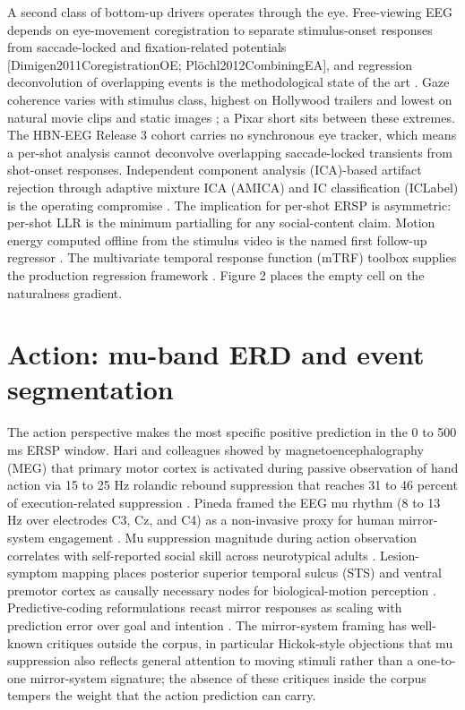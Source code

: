 \documentclass[preprint,12pt]{elsarticle}
\begin{document}
A second class of bottom-up drivers operates through the eye. Free-viewing EEG depends on eye-movement coregistration to separate stimulus-onset responses from saccade-locked and fixation-related potentials [Dimigen2011CoregistrationOE; Plöchl2012CombiningEA], and regression deconvolution of overlapping events is the methodological state of the art \cite{Dimigen2021RegressionbasedAO}. Gaze coherence varies with stimulus class, highest on Hollywood trailers and lowest on natural movie clips and static images \cite{Dorr2010VariabilityOE}; a Pixar short sits between these extremes. The HBN-EEG Release 3 cohort carries no synchronous eye tracker, which means a per-shot analysis cannot deconvolve overlapping saccade-locked transients from shot-onset responses. Independent component analysis (ICA)-based artifact rejection through adaptive mixture ICA (AMICA) and IC classification (ICLabel) is the operating compromise \cite{Bell1997TheC}. The implication for per-shot ERSP is asymmetric: per-shot LLR is the minimum partialling for any social-content claim. Motion energy computed offline from the stimulus video is the named first follow-up regressor \cite{Nishimoto2011ReconstructingVE,Nentwich2023SemanticNM}. The multivariate temporal response function (mTRF) toolbox supplies the production regression framework \cite{Crosse2016TheMT}. Figure 2 places the empty cell on the naturalness gradient.

\section{Action: mu-band ERD and event segmentation}

The action perspective makes the most specific positive prediction in the 0 to 500 ms ERSP window. Hari and colleagues showed by magnetoencephalography (MEG) that primary motor cortex is activated during passive observation of hand action via 15 to 25 Hz rolandic rebound suppression that reaches 31 to 46 percent of execution-related suppression \cite{hari1998action}. Pineda framed the EEG mu rhythm (8 to 13 Hz over electrodes C3, Cz, and C4) as a non-invasive proxy for human mirror-system engagement \cite{pineda2005mu}. Mu suppression magnitude during action observation correlates with self-reported social skill across neurotypical adults \cite{oberman2007mirror}. Lesion-symptom mapping places posterior superior temporal sulcus (STS) and ventral premotor cortex as causally necessary nodes for biological-motion perception \cite{saygin2007sts,johansson1973biological}. Predictive-coding reformulations recast mirror responses as scaling with prediction error over goal and intention \cite{kilner2007predictive,rizzolatti2004mirror,iacoboni2009mirror}. The mirror-system framing has well-known critiques outside the corpus, in particular Hickok-style objections that mu suppression also reflects general attention to moving stimuli rather than a one-to-one mirror-system signature; the absence of these critiques inside the corpus tempers the weight that the action prediction can carry.
\end{document}
